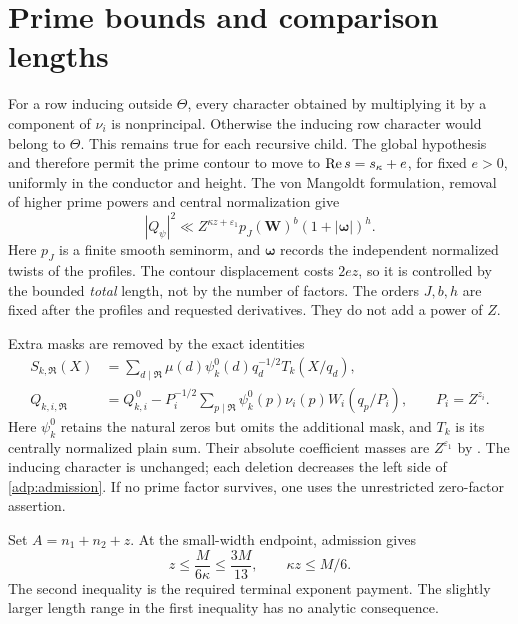 \section{Prime bounds and comparison lengths}\label{adp:numerical}

For a row inducing outside $\Theta$, every character obtained by
multiplying it by a component of $\nu_i$ is nonprincipal. Otherwise
the inducing row character would belong to $\Theta$. This remains
true for each recursive child. The global hypothesis and
\cite[Lemma 4.9]{OAI26} therefore permit the prime contour to move to
$\operatorname{Re} s=s_\kappa+e$, for fixed $e>0$, uniformly in the conductor
and height. The von Mangoldt formulation, removal of higher prime
powers and central normalization give
\begin{equation}\label{adp:prime}
 |Q_\psi|^2\ll Z^{\kappa z+\varepsilon_1}
       p_J(\boldsymbol W)^b(1+|\boldsymbol\omega|)^h .
\end{equation}
Here $p_J$ is a finite smooth seminorm, and $\boldsymbol\omega$
records the independent normalized twists of the profiles.
The contour displacement costs $2ez$, so it is controlled by the
bounded \emph{total} length, not by the number of factors.
The orders $J,b,h$ are fixed after the profiles and requested
derivatives. They do not add a power of $Z$.

Extra masks are removed by the exact identities
\begin{align*}
 S_{k,\mathfrak R}(X)
 &=\sum_{d\mid\mathfrak R}\mu(d)\psi_k^0(d)q_d^{-1/2}
                    T_k(X/q_d),\\
 Q_{k,i,\mathfrak R}
 &=Q_{k,i}^{\,0}-P_i^{-1/2}
       \sum_{p\mid\mathfrak R}\psi_k^0(p)\nu_i(p)W_i(q_p/P_i),
       \qquad P_i=Z^{z_i}.
\end{align*}
Here $\psi_k^0$ retains the natural zeros but omits the additional
mask, and $T_k$ is its centrally normalized plain sum.
Their absolute coefficient masses are $Z^{\varepsilon_1}$ by
\cite[Lemma 4.10 and Section 18.1]{OAI26}.
The inducing character is unchanged; each deletion decreases the
left side of \eqref{adp:admission}. If no prime factor survives,
one uses the unrestricted zero-factor assertion.

Set $A=n_1+n_2+z$. At the small-width endpoint, admission gives
\begin{equation}\label{adp:terminal}
 z\le\frac{M}{6\kappa}\le\frac{3M}{13},\qquad \kappa z\le M/6.
\end{equation}
The second inequality is the required terminal exponent payment.
The slightly larger length range in the first inequality has no
analytic consequence.

